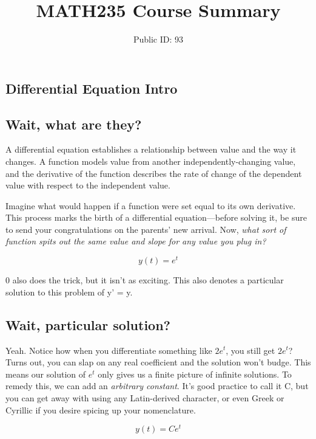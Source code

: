\documentclass[10pt]{extarticle}
\title{MATH235 Course Summary}
\date{}
\author{Public ID: 93}
\begin{document}
\maketitle
\newpage
{}

\begin{multicols}{2}
\section{Differential Equation Intro}
\subsection{Wait, what are they?}

A differential equation establishes a relationship between value and the way it
changes. A function models value from another independently-changing value, and
the derivative of the function describes the rate of change of the dependent
value with respect to the independent value. 

Imagine what would happen if a function were set equal to its own derivative.
This process marks the birth of a differential equation---before solving it,
be sure to send your congratulations on the parents' new arrival. Now, {\em
what sort of function spits out the same value and slope for any value you plug
in?}

\begin{equation*}
    y(t) = e^t
\end{equation*}

0 also does the trick, but it isn't as exciting. This also denotes a particular
solution to this problem of y' = y.


\subsection{Wait, particular solution?}

Yeah. Notice how when you differentiate something like \(2e^t\), you still get
\(2e^t\)? Turns out, you can slap on any real coefficient and the solution
won't budge. This means our solution of \(e^t\) only gives us a finite picture
of infinite solutions. To remedy this, we can add an {\em arbitrary constant}.
It's good practice to call it C, but you can get away with using any
Latin-derived character, or even Greek or Cyrillic if you desire spicing up
your nomenclature.

\begin{equation*}
    y(t) = Ce^t
\end{equation*}


\end{multicols}
\end{document}
